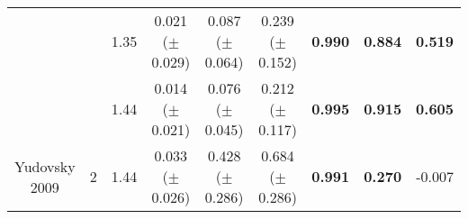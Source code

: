 \begin{table}[bhp]
\begin{tabular}{|cc|c|ccc|ccc|}
        & & 1.35 & \shortstack{0.021 \\($\pm$ 0.029)} & \shortstack{0.087 \\($\pm$ 0.064)} & \shortstack{0.239 \\($\pm$ 0.152)} & \textbf{0.990} & \textbf{0.884} & \textbf{0.519} \\
        & & 1.44 & \shortstack{0.014 \\($\pm$ 0.021)} & \shortstack{0.076 \\($\pm$ 0.045)} & \shortstack{0.212 \\($\pm$ 0.117)} & \textbf{0.995} & \textbf{0.915} & \textbf{0.605} \\
        \hline
        \shortstack{Yudovsky\\ 2009} & 2 & 1.44 & \shortstack{0.033 \\($\pm$ 0.026)} & \shortstack{0.428 \\($\pm$ 0.286)} & \shortstack{0.684 \\($\pm$ 0.286)} & \textbf{0.991} & \textbf{0.270} & -0.007 \\
        \hline
    \end{tabular}
    \label{ap:forwardsHSIMCr}
\end{table}
\FloatBarrier


